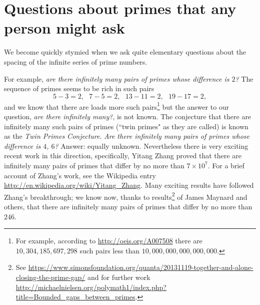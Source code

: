 \documentclass[openany]{book}
\theoremstyle{plain}
\theoremstyle{definition}
\begin{document}
%

%


\chapter[Questions about primes]{Questions about primes that any person might ask}\label{ch:questions}

We become quickly stymied when we ask quite elementary questions about
the spacing of the infinite series of prime numbers.

For example, {\em are there infinitely many pairs of primes whose
  difference is $2$?}  The sequence of primes seems to be rich in such
pairs $$5-3 =2,\ \ \ 7-5=2,\ \ \ 13-11=2,\ \ \ 19-17 =2,$$ and we know
that there are loads more such pairs\footnote{For example, according to
\url{http://oeis.org/A007508} there are
$10{,}304{,}185{,}697{,}298$ such pairs less than
$10{,}000{,}000{,}000{,}000{,}000$.} but the answer to our question,
{\em are there infinitely many?}, is not known. The conjecture that there are infinitely many such pairs of primes (``twin primes" as they are called) is known as the {\it Twin Primes Conjecture}.
{\em Are there
  infinitely many pairs of primes whose difference is $4$, $6$?}  Answer:
equally unknown.
Nevertheless there is very exciting recent work in this direction, specifically,
Yitang Zhang proved that there are infinitely many pairs of primes that differ
by no more than $7\times 10^7$. For a brief account of
Zhang's work, see the Wikipedia entry \url{http://en.wikipedia.org/wiki/Yitang_Zhang}.
Many exciting results have followed Zhang's breakthrough;
we know now, thanks to results\footnote{See \url{https://www.simonsfoundation.org/quanta/20131119-together-and-alone-closing-the-prime-gap/} and for further work
\url{http://michaelnielsen.org/polymath1/index.php?title=Bounded_gaps_between_primes}.} of James Maynard and
others, that there are infinitely many pairs of primes
that differ by no more than $246$.
\end{document}
